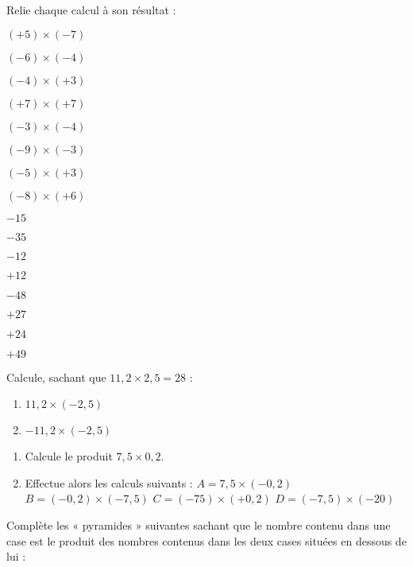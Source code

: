 \begin{exercice}Relie chaque calcul à son résultat :
\begin{colitemize}{2}
\item $(+5) \times (-7)$
\item $(-6) \times (-4)$
\item $(-4) \times (+3)$
\item $(+7)	\times (+7)$
\item $(-3) \times (-4)$
\item $(-9) \times (-3)$
\item $(-5) \times (+3)$
\item $(-8) \times (+6)$
\item $-15$
\item $-35$
\item $-12$
\item $+12$
\item $-48$
\item $+27$
\item $+24$
\item $+49$
\end{colitemize}
\end{exercice}



\begin{exercice}Calcule, sachant que $11,2 \times 2,5 = 28$ :
\begin{enumerate}
\item $11,2 \times (-2,5)$
\item $-11,2 \times (-2,5)$
\end{enumerate}
\end{exercice}


\newpage
\begin{exercice}
\begin{enumerate}
\item Calcule le produit $7,5 \times 0,2$.
\item Effectue alors les calculs suivants :
\subitem $A = 7,5 \times (-0,2)$
\subitem $B = (-0,2) \times (-7,5)$
\subitem $C = (-75) \times (+0,2)$
\subitem $D = (-7,5) \times (-20)$
\end{enumerate}
\end{exercice}



\begin{exercice}Complète les « pyramides » suivantes sachant que le nombre contenu dans une case est le produit des nombres contenus dans les deux cases situées en dessous de lui :
\end{exercice}


